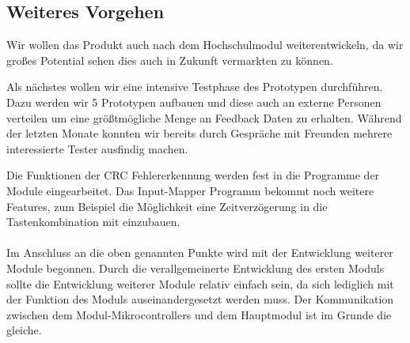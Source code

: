 \subsection{Weiteres Vorgehen}
Wir wollen das Produkt auch nach dem Hochschulmodul weiterentwickeln, da wir großes Potential sehen dies auch in Zukunft vermarkten zu können.

Als nächstes wollen wir eine intensive Testphase des Prototypen durchführen. Dazu werden wir 5 Prototypen aufbauen und diese auch an externe Personen verteilen um eine größtmögliche Menge an Feedback Daten zu erhalten.
Während der letzten Monate konnten wir bereits durch Gespräche mit Freunden mehrere interessierte Tester ausfindig machen.

Die Funktionen der CRC Fehlererkennung werden fest in die Programme der Module eingearbeitet. Das Input-Mapper Programm bekommt noch weitere Features, zum Beispiel die Möglichkeit eine Zeitverzögerung in die Tastenkombination mit einzubauen.
\\\\
Im Anschluss an die oben genannten Punkte wird mit der Entwicklung weiterer Module begonnen. Durch die verallgemeinerte Entwicklung des ersten Moduls sollte die Entwicklung weiterer Module relativ einfach sein, da sich lediglich mit der Funktion des Moduls auseinandergesetzt werden muss. Der Kommunikation zwischen dem Modul-Mikrocontrollers und dem Hauptmodul ist im Grunde die gleiche.
